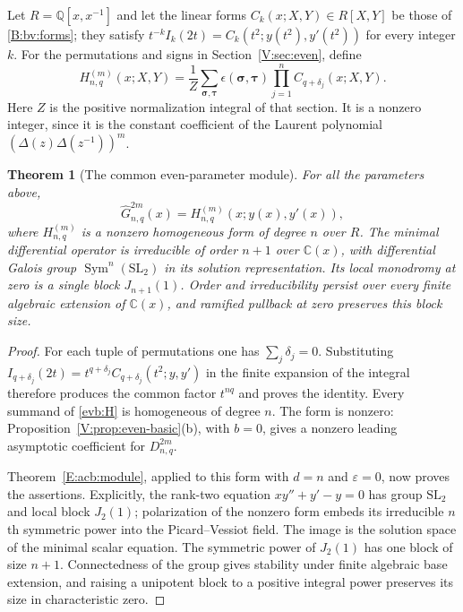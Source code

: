 \documentclass[11pt,a4paper]{article}
\newtheorem{theorem}{Theorem}[section]
\theoremstyle{definition}
\theoremstyle{remark}
\numberwithin{equation}{section}
\begin{document}
Let $R=\mathbb Q[x,x^{-1}]$ and let the linear forms
$C_k(x;X,Y)\in R[X,Y]$ be those of
\eqref{B:bv:forms}; they satisfy
$t^{-k}I_k(2t)=C_k(t^2;y(t^2),y'(t^2))$ for every integer $k$.
For the permutations and signs in Section~\ref{V:sec:even}, define
\begin{equation}\label{evb:H}
 H^{(m)}_{n,q}(x;X,Y)
   =\frac1Z\sum_{\boldsymbol\sigma,\boldsymbol\tau}
       \epsilon(\boldsymbol\sigma,\boldsymbol\tau)
       \prod_{j=1}^n C_{q+\delta_j}(x;X,Y).
\end{equation}
Here $Z$ is the positive normalization integral of that section.
It is a nonzero integer, since it is the constant coefficient of the
Laurent polynomial $(\Delta(z)\Delta(z^{-1}))^m$.

\begin{theorem}[The common even-parameter module]\label{evb:module}
For all the parameters above,
\[
 \widehat G^{2m}_{n,q}(x)=H^{(m)}_{n,q}(x;y(x),y'(x)),
\]
where $H^{(m)}_{n,q}$ is a nonzero homogeneous form of degree $n$
over $R$. The minimal differential operator is irreducible of order
$n+1$ over $\mathbb C(x)$, with differential Galois group
$\operatorname{Sym}^{n}(\mathrm{SL}_2)$ in its solution
representation. Its local monodromy at zero is a single block
$J_{n+1}(1)$. Order and irreducibility persist over every finite
algebraic extension of $\mathbb C(x)$, and ramified pullback at zero
preserves this block size.
\end{theorem}

\begin{proof}
For each tuple of permutations one has
$\sum_j\delta_j=0$. Substituting
$I_{q+\delta_j}(2t)=t^{q+\delta_j}
C_{q+\delta_j}(t^2;y,y')$ in the finite expansion of the integral
therefore produces the common factor $t^{nq}$ and proves the identity.
Every summand of \eqref{evb:H} is homogeneous of degree $n$.
The form is nonzero: Proposition~\ref{V:prop:even-basic}(b), with
$b=0$, gives a nonzero leading asymptotic coefficient for
$D^{2m}_{n,q}$.

Theorem~\ref{E:acb:module}, applied to this form with $d=n$ and
$\varepsilon=0$, now proves the assertions. Explicitly, the rank-two
equation $xy''+y'-y=0$ has group $\mathrm{SL}_2$ and local block
$J_2(1)$; polarization of the nonzero form embeds its irreducible
$n$th symmetric power into the Picard--Vessiot field. The image is
the solution space of the minimal scalar equation. The symmetric
power of $J_2(1)$ has one block of size $n+1$. Connectedness of the
group gives stability under finite algebraic base extension, and
raising a unipotent block to a positive integral power preserves its
size in characteristic zero.
\end{proof}
\end{document}
